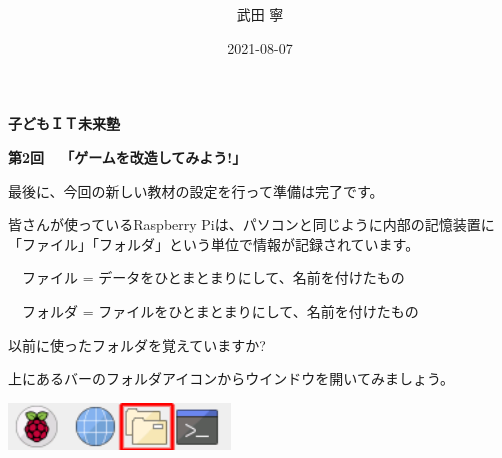 \documentclass[a4paper,dvipdfmx]{jarticle}
\title{ }
\author{武田 寧}
\date{2021-08-07}
\begin{document}
\clearpage\clearpage\setcounter{page}{1}\pagestyle{MP}

\bigskip


\bigskip


\bigskip


\bigskip


\bigskip


\bigskip


\bigskip


\bigskip


\bigskip


\bigskip


\bigskip


\bigskip


\bigskip


\bigskip


\bigskip


\bigskip


\bigskip


\bigskip

{\bfseries
子どもＩＴ未来塾}

{\bfseries
第2回\ \ 「ゲームを改造してみよう!」}


\bigskip



\bigskip

最後に、今回の新しい教材の設定を行って準備は完了です。

皆さんが使っているRaspberry
Piは、パソコンと同じように内部の記憶装置に「ファイル」「フォルダ」という単位で情報が記録されています。


\bigskip

\ \ ファイル =
データをひとまとまりにして、名前を付けたもの

\ \ フォルダ =
ファイルをひとまとまりにして、名前を付けたもの


\bigskip

以前に使ったフォルダを覚えていますか?

上にあるバーのフォルダアイコンからウインドウを開いてみましょう。



\begin{center}
\includegraphics[width=5.898cm,height=1.242cm]{text02-img/text02-img001.png}

\end{center}
\end{document}
